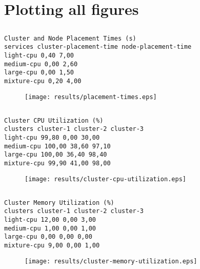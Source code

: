 \documentclass{elsart}
\begin{document}
\section{Plotting all figures}
\subsection{}

\begin{lstlisting}[caption={}]
Cluster and Node Placement Times (s)
services cluster-placement-time node-placement-time
light-cpu 0,40 7,00
medium-cpu 0,00 2,60
large-cpu 0,00 1,50
mixture-cpu 0,20 4,00
\end{lstlisting}

\begin{figure}[ht]
\centering
\texttt{[image: results/placement-times.eps]}
\caption{}\label{fig:placement-times.eps}
\end{figure}

\subsection{}

\begin{lstlisting}[caption={}]
Cluster CPU Utilization (%)
clusters cluster-1 cluster-2 cluster-3
light-cpu 99,80 0,00 30,00
medium-cpu 100,00 38,60 97,10
large-cpu 100,00 36,40 98,40
mixture-cpu 99,90 41,00 98,00
\end{lstlisting}

\begin{figure}[ht]
\centering
\texttt{[image: results/cluster-cpu-utilization.eps]}
\caption{}\label{fig:cluster-cpu-utilization.eps}
\end{figure}

\subsection{}

\begin{lstlisting}[caption={}]
Cluster Memory Utilization (%)
clusters cluster-1 cluster-2 cluster-3
light-cpu 12,00 0,00 3,00
medium-cpu 1,00 0,00 1,00
large-cpu 0,00 0,00 0,00
mixture-cpu 9,00 0,00 1,00
\end{lstlisting}

\begin{figure}[ht]
\centering
\texttt{[image: results/cluster-memory-utilization.eps]}
\caption{}\label{fig:cluster-memory-utilization.eps}
\end{figure}
\end{document}
